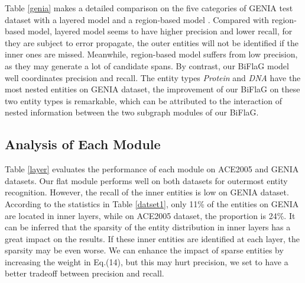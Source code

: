 \documentclass[11pt,a4paper]{article}
\begin{document}
Table \ref{genia} makes a detailed comparison on the five categories of GENIA test dataset with a layered model \cite{ju2018neural} and a region-based model \cite{zheng2019boundary}.
Compared with region-based model, layered model seems to have higher precision and lower recall, for they are subject to error propagate, the outer entities will not be identified if the inner ones are missed. Meanwhile, region-based model suffers from low precision, as they may generate a lot of candidate spans. By contrast, our BiFlaG model well coordinates precision and recall. The entity types \textit{Protein} and \textit{DNA} have the most nested entities on GENIA dataset, the improvement of our BiFlaG on these two entity types is remarkable, which can be attributed to the interaction of nested information between the two subgraph modules of our BiFlaG.

\subsection{Analysis of Each Module}
Table \ref{layer} evaluates the performance of each module on ACE2005 and GENIA datasets. Our flat module performs well on both datasets for outermost entity recognition. However, the recall of the inner entities is low on GENIA dataset.
According to the statistics in Table \ref{datset1}, only 11\% of the entities on GENIA are located in inner layers, while on ACE2005 dataset, the proportion is 24\%.
It can be inferred that the sparsity of the entity distribution in inner layers has a great impact on the results. If these inner entities are identified at each layer, the sparsity may be even worse.
We can enhance the impact of sparse entities by increasing the weight  in Eq.(14), but this may hurt precision, we set  to have a better tradeoff between precision and recall.

\begin{table}[h!]
\caption{Performance of each module on ACE2005 and GENIA datasets.}
\label{layer}
\end{table}  
\end{document}
